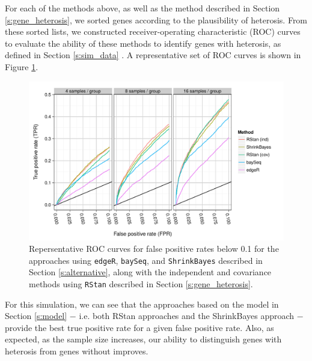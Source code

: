 \documentclass[useAMS,usenatbib,referee]{biom}
\begin{document}
For each of the methods above, as well as the method described in Section \ref{s:gene_heterosis}, we sorted genes according to the plausibility of heterosis. From these sorted lists, we constructed receiver-operating characteristic (ROC) curves to evaluate the ability of these methods to identify genes with heterosis, as defined in Section \ref{s:sim_data}  \citep{landau2013dispersion}. A representative set of ROC curves is shown in Figure \ref{f:roc}. 
\begin{figure}[htbp]
\centerline{\includegraphics[width=\textwidth]{exampleROC0_1}}
\caption{Repersentative ROC curves for false positive rates below 0.1 for the approaches using {\tt edgeR}, {\tt baySeq},  and {\tt ShrinkBayes} described in Section \ref{s:alternative}, along with the independent and covariance methods using {\tt RStan} described in Section \ref{s:gene_heterosis}.}
\label{f:roc}
\end{figure}
For this simulation, we can see that the approaches based on the model in Section \ref{s:model} $-$ i.e. both RStan approaches and the ShrinkBayes approach $-$ provide the best true positive rate for a given false positive rate. Also, as expected, as the sample size increases, our ability to distinguish genes with heterosis from genes without improves.
\end{document}
